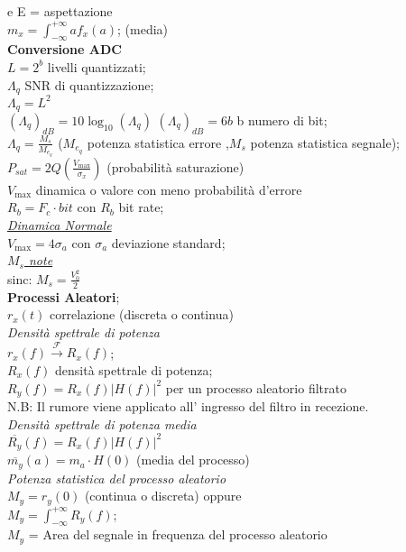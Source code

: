 \documentclass[a4paper]{article}
\begin{document}
\begin{multicols*}{3}
e E = aspettazione\\
$m_x=\int_{-\infty}^{+\infty} a f_x(a)$; (media)\\
\textbf{Conversione ADC} \\
$L=2^b$ livelli quantizzati; \\
${\Lambda_q}$ SNR di quantizzazione; \\
$\Lambda_q = L^2$ \\
${({\Lambda}_q)}_{dB}=10\log_{10}{(\Lambda_q)}$
${(\Lambda_q)}_{dB} = 6b$ b numero di bit; \\
${\Lambda}_q=\frac{M_s}{M_{e_q}}$ ($M_{e_q}$ potenza statistica errore
,$M_s$ potenza statistica segnale); \\
$P_{sat}=2Q(\frac{V_{\max}}{\sigma_x})$ (probabilità saturazione) \\
$V_{\max}$ dinamica o valore con meno probabilità d'errore \\
$R_b=F_c \cdot bit$ con $R_b$ bit rate; \\
\underline{\textit{Dinamica Normale}} \\
$V_{\max} = 4\sigma_a$ con $\sigma_a$ deviazione standard;\\ 
\underline{\textit{$M_s$ note}} \\
sinc: $M_s = \frac{V_0^2}{2}$ \\
\textbf{Processi Aleatori}; \\
$r_x(t)$ correlazione (discreta o continua) \\
\textit{Densità spettrale di potenza} \\
$r_x(f) \xrightarrow{\mathscr{F}} R_x(f)$; \\ 
$R_x(f)$ densità spettrale di potenza; \\
$R_y(f) = R_x(f) |H(f)|^2$ per un processo aleatorio filtrato\\
N.B: Il rumore viene applicato all' ingresso del filtro in recezione. \\
\textit{Densità spettrale di potenza media} \\
$\overline{R_y}(f) = R_x(f) |H(f)|^2$ \\
$\overline{m_y}(a)=m_a\cdot H(0)$ (media del processo)\\
\textit{Potenza statistica del processo aleatorio} \\
$M_y = r_y(0)$ (continua o discreta) oppure \\
$M_y = \int_{-\infty}^{+\infty} R_y(f)$;\\
$M_y$ = Area del segnale in frequenza del processo aleatorio \\

\end{multicols*}
\end{document}
